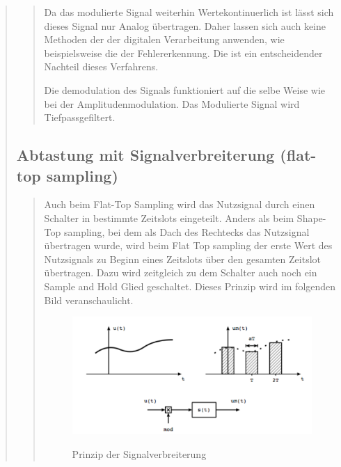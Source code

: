 \begin{quote}
\begin{quote}
        Da das modulierte Signal weiterhin Wertekontinuerlich ist lässt sich dieses Signal nur Analog übertragen. Daher
        lassen sich auch keine Methoden der der digitalen Verarbeitung anwenden, wie beispielsweise die
        der Fehlererkennung. Die ist ein entscheidender Nachteil dieses Verfahrens.\vspace{1em}
        
        Die demodulation des Signals funktioniert auf die selbe Weise wie bei der Amplitudenmodulation. Das
        Modulierte Signal wird Tiefpassgefiltert. 
        
    \end{quote}%
    
    \subsection{Abtastung mit Signalverbreiterung (flat-top sampling)}
    \begin{quote}
        Auch beim Flat-Top Sampling wird das Nutzsignal durch einen Schalter in bestimmte Zeitslots eingeteilt. Anders
        als beim Shape-Top sampling, bei dem als Dach des Rechtecks das Nutzsignal übertragen wurde, wird beim Flat Top
        sampling der erste Wert des Nutzsignals zu Beginn eines Zeitslots über den gesamten Zeitslot übertragen. 
        Dazu wird zeitgleich zu dem Schalter auch noch ein Sample and Hold Glied
        geschaltet. Dieses Prinzip wird im folgenden Bild veranschaulicht.
        
        \begin{figure}[H]
        \centering
            \includegraphics[scale=0.7, trim = 0cm 0cm 0cm 0cm, clip]{./Bilder/PrinzipSignalverbreiterung}
                \caption{Prinzip der Signalverbreiterung}
                \cite{AmplitudenspektrumShap_Top}
        \end{figure}
        

\end{quote}
\end{quote}
